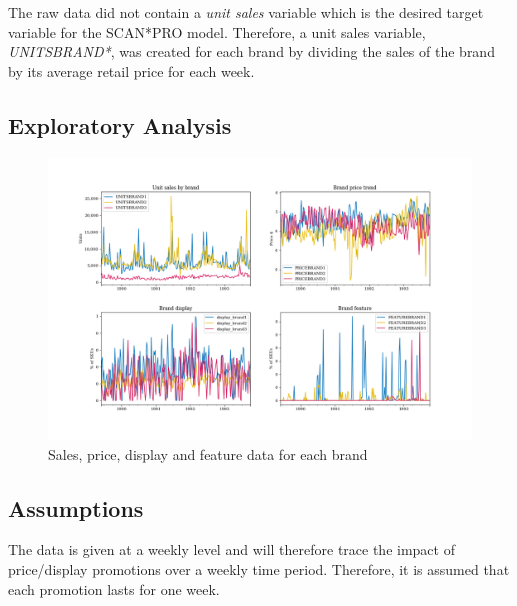 \documentclass[a4paper,11pt]{article}
\begin{document}
The raw data did not contain a \textit{unit sales} variable which is the desired target variable for the SCAN*PRO model. Therefore, a unit sales variable, \textit{UNITSBRAND*}, was created for each brand by dividing the sales of the brand by its average retail price for each week.

\subsection{Exploratory Analysis}

\begin{figure}
  \centering
  \includegraphics[scale=0.38]{eda_plots}
  \caption{Sales, price, display and feature data for each brand}\label{fig:eda-plots}
\end{figure}



\subsection{Assumptions}
The data is given at a weekly level and will therefore trace the impact of price/display promotions over a weekly time period. Therefore, it is assumed that each promotion lasts for one week.
\end{document}
